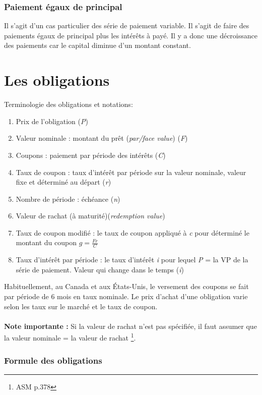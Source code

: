 \documentclass[11pt,french]{report}
\begin{document}
\subsection{Paiement égaux de principal}
\label{equal principal payments}

Il s'agit d'un cas particulier des série de paiement variable. Il s'agit de faire des paiements égaux de principal plus les intérêts à payé.  Il y a donc une décroissance des paiements car le capital diminue d'un montant constant.




\chapter{Les obligations}
\label{Chap:obligations}

Terminologie des obligations et notations:
\begin{enumerate}
\item Prix de l'obligation (\textit{P})
\item Valeur nominale : montant du prêt (\textit{par/face value}) (\textit{F})
\item Coupons : paiement par période des intérêts (\textit{C})
\item Taux de coupon : taux d'intérêt par période sur la valeur nominale, valeur fixe et déterminé au départ (\textit{r})
\item Nombre de période : échéance (\textit{n})
\item Valeur de rachat (à maturité)(\textit{redemption value})
\item Taux de coupon modifié : le taux de coupon appliqué à \textit{c} pour déterminé le montant du coupon $ g = \frac{Fr}{C}$
\item Taux d'intérêt par période : le taux d'intérêt \textit{i} pour lequel \textit{P} = la VP de la série de paiement. Valeur qui change dans le temps (\textit{i})
\end{enumerate}
Habituellement, au Canada et aux États-Unis, le versement des coupons se fait par période de 6 mois en taux nominale. Le prix d'achat d'une obligation varie selon les taux sur le marché et le taux de coupon.
\\
\\\textbf{Note importante :} Si la valeur de rachat n'est pas spécifiée, il faut assumer que la valeur nominale = la valeur de rachat \footnote{ASM p.378}. 
\pagebreak

\subsection{Formule des obligations}
\label{sub:sec:formules obligtions}
\end{document}
